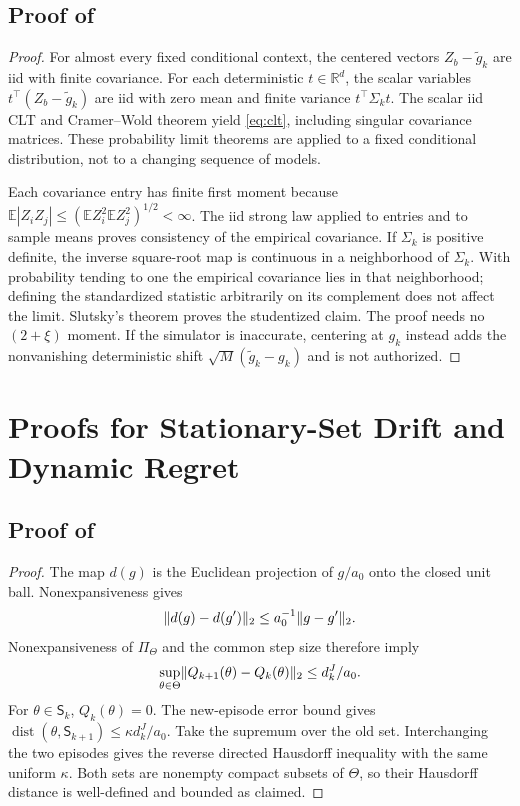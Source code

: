 \documentclass[11pt]{article}
\newcommand{\E}{\mathbb E}
\newcommand{\R}{\mathbb R}
\newcommand{\1}{\mathbf 1}
\newcommand{\dist}{\operatorname{dist}}
\DeclarePairedDelimiter{\norm}{\lVert}{\rVert}
\newcommand{\Sta}{\mathsf S}
\theoremstyle{definition}
\begin{document}
\subsection{Proof of \texorpdfstring{}{the fixed-episode CLT}}
\begin{proof}
For almost every fixed conditional context, the centered vectors $Z_b-\widetilde g_k$ are iid with finite covariance. For each deterministic $t\in\R^d$, the scalar variables $t^\top(Z_b-\widetilde g_k)$ are iid with zero mean and finite variance $t^\top\Sigma_kt$. The scalar iid CLT and Cramer--Wold theorem yield \eqref{eq:clt}, including singular covariance matrices. These probability limit theorems are applied to a fixed conditional distribution, not to a changing sequence of models.

Each covariance entry has finite first moment because
$\E|Z_iZ_j|\le(\E Z_i^2\E Z_j^2)^{1/2}<\infty$. The iid strong law applied to entries and to sample means proves consistency of the empirical covariance. If $\Sigma_k$ is positive definite, the inverse square-root map is continuous in a neighborhood of $\Sigma_k$. With probability tending to one the empirical covariance lies in that neighborhood; defining the standardized statistic arbitrarily on its complement does not affect the limit. Slutsky's theorem proves the studentized claim. The proof needs no $(2+\xi)$ moment. If the simulator is inaccurate, centering at $g_k$ instead adds the nonvanishing deterministic shift $\sqrt M(\widetilde g_k-g_k)$ and is not authorized.
\end{proof}

\section{Proofs for Stationary-Set Drift and Dynamic Regret}\label{app:regret-proofs}
\subsection{Proof of \texorpdfstring{}{the stationary-set drift lemma}}
\begin{proof}
The map $d(g)$ is the Euclidean projection of $g/a_0$ onto the closed unit ball. Nonexpansiveness gives
\begin{equation}\label{eq:normalization-lipschitz}
 \norm{d(g)-d(g')}_2\le a_0^{-1}\norm{g-g'}_2.
\end{equation}
Nonexpansiveness of $\Pi_\Theta$ and the common step size therefore imply
\[
 \sup_{\theta\in\Theta}\norm{Q_{k+1}(\theta)-Q_k(\theta)}_2
 \le d_k^J/a_0.
\]
For $\theta\in\Sta_k$, $Q_k(\theta)=0$. The new-episode error bound gives
$\dist(\theta,\Sta_{k+1})\le\kappa d_k^J/a_0$.
Take the supremum over the old set. Interchanging the two episodes gives the reverse directed Hausdorff inequality with the same uniform $\kappa$. Both sets are nonempty compact subsets of $\Theta$, so their Hausdorff distance is well-defined and bounded as claimed.
\end{proof}
\end{document}
